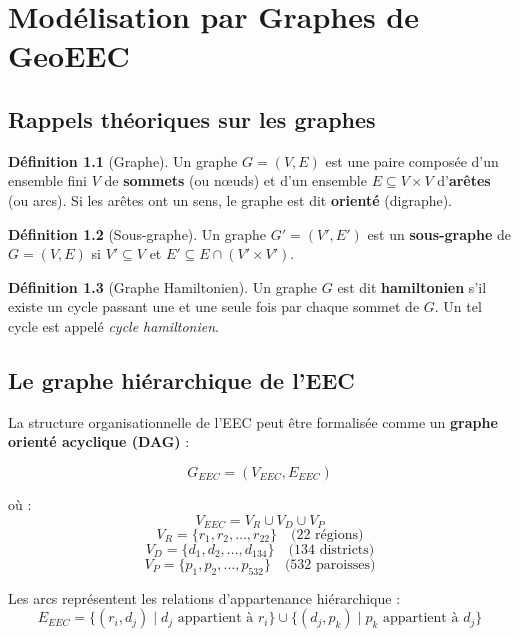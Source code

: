 \documentclass[12pt, a4paper]{report}
\theoremstyle{definition}
\newtheorem{definition}{Définition}[chapter]
\begin{document}
\chapter{Modélisation par Graphes de GeoEEC}

\section{Rappels théoriques sur les graphes}

\begin{definition}[Graphe]
Un graphe $G = (V, E)$ est une paire composée d'un ensemble fini $V$ de \textbf{sommets} (ou nœuds) et d'un ensemble $E \subseteq V \times V$ d'\textbf{arêtes} (ou arcs). Si les arêtes ont un sens, le graphe est dit \textbf{orienté} (digraphe).
\end{definition}

\begin{definition}[Sous-graphe]
Un graphe $G' = (V', E')$ est un \textbf{sous-graphe} de $G = (V, E)$ si $V' \subseteq V$ et $E' \subseteq E \cap (V' \times V')$.
\end{definition}

\begin{definition}[Graphe Hamiltonien]
Un graphe $G$ est dit \textbf{hamiltonien} s'il existe un cycle passant une et une seule fois par chaque sommet de $G$. Un tel cycle est appelé \textit{cycle hamiltonien}.
\end{definition}

\section{Le graphe hiérarchique de l'EEC}

La structure organisationnelle de l'EEC peut être formalisée comme un \textbf{graphe orienté acyclique (DAG)} :

$$G_{EEC} = (V_{EEC}, E_{EEC})$$

où :
$$V_{EEC} = V_R \cup V_D \cup V_P$$
$$V_R = \{r_1, r_2, \ldots, r_{22}\} \quad \text{(22 régions)}$$
$$V_D = \{d_1, d_2, \ldots, d_{134}\} \quad \text{(134 districts)}$$
$$V_P = \{p_1, p_2, \ldots, p_{532}\} \quad \text{(532 paroisses)}$$

Les arcs représentent les relations d'appartenance hiérarchique :
$$E_{EEC} = \{(r_i, d_j) \mid d_j \text{ appartient à } r_i\} \cup \{(d_j, p_k) \mid p_k \text{ appartient à } d_j\}$$
\end{document}
